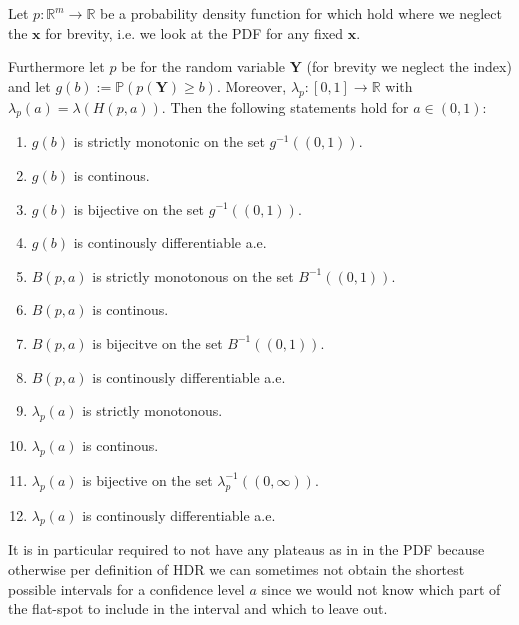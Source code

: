 \begin{lemma}\label{lem:continuity}
    Let \(p: \mathbb{R}^m \to \mathbb{R}\) be a probability density function for which  hold where we neglect the $\mathbf{x}$ for brevity, i.e. we look at the PDF for any fixed $\mathbf{x}$.

    Furthermore let $p$ be for the random variable $\mathbf{Y}$ (for brevity we neglect the index) and let $g(b) := \mathbb{P}(p(\mathbf{Y}) \geq b)$. Moreover, $\lambda_p:[0, 1] \to \mathbb{R}$ with $\lambda_p(a) = \lambda(H(p, a))$. Then the following statements hold for $a \in (0,1)$:

    \begin{enumerate}
        \item $g(b)$ is strictly monotonic on the set $g^{-1}((0,1))$.
        \item $g(b)$ is continous.
        \item $g(b)$ is bijective on the set $g^{-1}((0,1))$.
        \item $g(b)$ is continously differentiable a.e. 
        \item $B(p, a)$ is strictly monotonous on the set $B^{-1}((0,1))$.
        \item $B(p, a)$ is continous.
        \item $B(p, a)$ is bijecitve on the set $B^{-1}((0,1))$.
        \item $B(p, a)$ is continously differentiable a.e.
        \item $\lambda_p(a)$ is strictly monotonous.
        \item $\lambda_p(a)$ is continous.
        \item $\lambda_p(a)$ is bijective on the set $\lambda_p^{-1}((0,\infty))$.
        \item $\lambda_p(a)$ is continously differentiable a.e. 
    \end{enumerate}
\end{lemma}

It is in particular required to not have any plateaus as in in  the PDF because otherwise per definition of HDR we can sometimes not obtain the shortest possible intervals for a confidence level $a$ since we would not know which part of the flat-spot to include in the interval and which to leave out.

